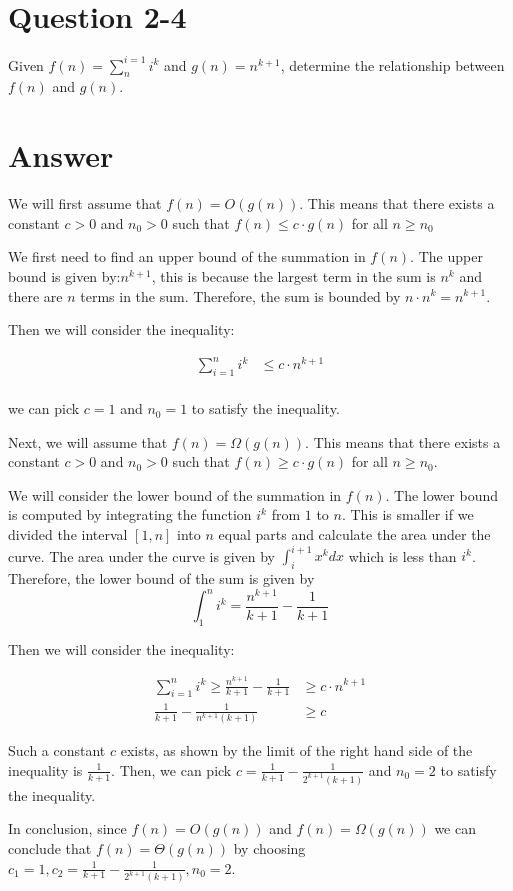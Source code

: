 \documentclass{article}
\begin{document}
\section{Question 2-4}
Given $f(n) = \sum_{n}^{i=1}i^k$ and $g(n) = n^{k+1}$, determine the relationship between $f(n)$ and $g(n)$.

\section{Answer}
We will first assume that $f(n) = O(g(n))$. This means that there exists a constant $c > 0$ and $n_0 > 0$ such that $f(n) \leq c \cdot g(n)$ for all $n \geq n_0$


We first need to find an upper bound of the summation in $f(n)$. The upper bound is given by:$n^{k+1}$, this is because the largest term in the sum is $n^k$ and there are $n$ terms in the sum. Therefore, the sum is bounded by $n \cdot n^k = n^{k+1}$.

Then we will consider the inequality:

\begin{align*}
\sum_{i=1}^{n}i^k &\leq c \cdot n^{k+1} \\
\end{align*}

we can pick $c = 1$ and $n_0 = 1$ to satisfy the inequality.

Next, we will assume that $f(n) = \Omega(g(n))$. This means that there exists a constant $c > 0$ and $n_0 > 0$ such that $f(n) \geq c \cdot g(n)$ for all $n \geq n_0$.

We will consider the lower bound of the summation in $f(n)$. The lower bound is computed by integrating the function $i^k$ from $1$ to $n$. This is smaller if we divided the interval $[1,n]$ into $n$ equal parts and calculate the area under the curve. The area under the curve is given by $\int_{i}^{i+1} x^k dx$ which is less than $i^k$. Therefore, the lower bound of the sum is given by 
$$\int_{1}^{n} i^k = \frac{n^{k+1}}{k+1} - \frac{1}{k+1}$$

Then we will consider the inequality:

\begin{align*}
\sum_{i=1}^{n}i^k \geq \frac{n^{k+1}}{k+1} - \frac{1}{k+1} &\geq c \cdot n^{k+1} \\
\frac{1}{k+1} - \frac{1}{n^{k+1}(k+1)} &\geq c
\end{align*}

Such a constant $c$ exists, as shown by the limit of the right hand side of the inequality is $\frac{1}{k+1}$.
Then, we can pick $c = \frac{1}{k+1} - \frac{1}{2^{k+1}(k+1)}$ and $n_0 = 2$ to satisfy the inequality.

In conclusion, since $f(n) = O(g(n))$ and $f(n) = \Omega(g(n))$ we can conclude that $f(n) = \Theta(g(n))$ by choosing $c_1 = 1, c_2 = \frac{1}{k+1} - \frac{1}{2^{k+1}(k+1)}, n_0 = 2$.
\end{document}
